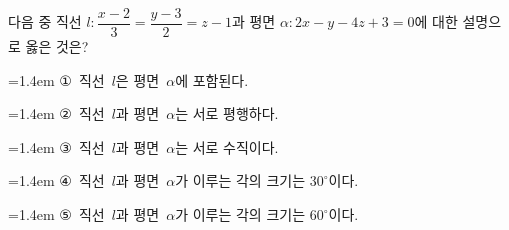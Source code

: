 다음 중 직선 $l\colon \dfrac{x-2}{3}=\dfrac{y-3}{2}=z-1$과 평면 $\alpha\colon 2x-y-4z+3=0$에 대한 설명으로 옳은 것은?
\par\medskip\par\noindent\hangindent=1.4em {\small ①}\ 직선~$l$은 평면~$\alpha$에 포함된다.\par\noindent\hangindent=1.4em {\small ②}\ 직선~$l$과 평면~$\alpha$는 서로 평행하다.\par\noindent\hangindent=1.4em {\small ③}\ 직선~$l$과 평면~$\alpha$는 서로 수직이다.\par\noindent\hangindent=1.4em {\small ④}\ 직선~$l$과 평면~$\alpha$가 이루는 각의 크기는 $30^\circ$이다.\par\noindent\hangindent=1.4em {\small ⑤}\ 직선~$l$과 평면~$\alpha$가 이루는 각의 크기는 $60^\circ$이다.\par\medskip

